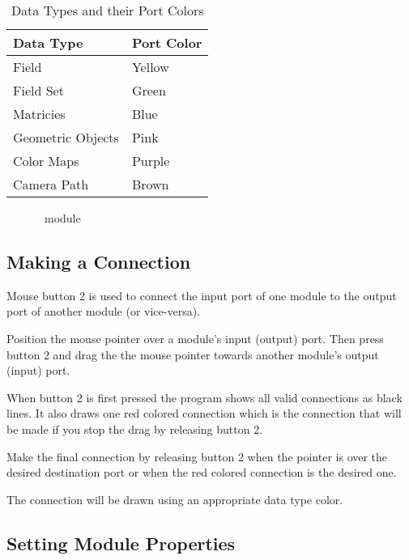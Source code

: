 \begin{table}[htbp]
  \begin{center}
    \begin{tabular}{|l|l|}
      \textbf{Data Type} & \textbf{Port Color} \\
      \hline
      Field & Yellow \\
      Field Set & Green \\
      Matricies & Blue \\
      Geometric Objects & Pink \\
      Color Maps & Purple \\
      Camera Path & Brown \\
      \hline
    \end{tabular}
    \caption{Data Types and their Port Colors}
    \label{tab:portcolors}
  \end{center}
\end{table}


\begin{figure}[htb]
  \begin{makeimage}
  \end{makeimage}
  \modgraphic
  \caption{\label{fig:module} \sr\ module}
\end{figure}


\subsection{Making a Connection}
\label{sec:connectmods}

Mouse button 2 is used to connect the input port of one module to
the output port of another module (or vice-versa).  

Position the mouse pointer over a module's input (output) port.  Then press
button 2 and drag the the mouse pointer towards another module's output (input)
port.   

When button 2 is first pressed the program shows all valid connections as
black lines.  It also draws one red colored connection which is the
connection that will be made if you stop the drag by releasing 
button 2.

Make the final connection by releasing button 2 when the pointer is over
the desired destination port or when the red colored connection is the
desired one.

The connection will be drawn using an appropriate data type color.

\subsection{Setting Module Properties}
\label{sec:setmodprops}

